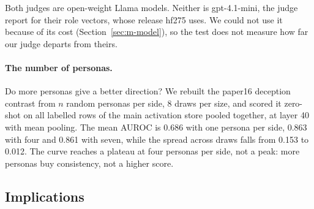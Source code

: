 Both judges are open-weight Llama models. Neither is gpt-4.1-mini, the judge \textcite[p.~3]{lu2026assistant} report for their role vectors, whose release hf275 uses. We could not use it because of its cost (Section~\ref{sec:m-model}), so the test does not measure how far our judge departs from theirs. %

\paragraph{The number of personas.} Do more personas give a better direction? %
We rebuilt the paper16 deception contrast from $n$ random personas per side, 8 draws per size, and scored it zero-shot on all labelled rows of the main activation store pooled together, at layer 40 with mean pooling. %
The mean AUROC is 0.686 with one persona per side, 0.863 with four and 0.861 with seven, while the spread across draws falls from 0.153 to 0.012. %
The curve reaches a plateau at four personas per side, not a peak: more personas buy consistency, not a higher score. %

\subsection{Implications}
\label{sec:r-implications}

